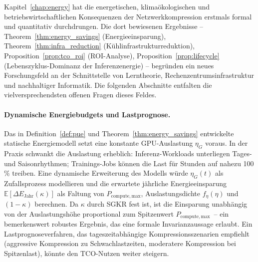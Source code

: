 ﻿\documentclass[12pt, a4paper, openany]{report}
\newcommand{\E}{\mathbb{E}}
\begin{document}
Kapitel~\ref{chap:energy} hat die energetischen, klimaökologischen und
betriebswirtschaftlichen Konsequenzen der Netzwerkkompression erstmals
formal und quantitativ durchdrungen.  Die dort bewiesenen Ergebnisse
-- Theorem~\ref{thm:energy_savings} (Energieeinsparung),
Theorem~\ref{thm:infra_reduction} (Kühlinfrastrukturreduktion),
Proposition~\ref{prop:tco_roi} (ROI-Analyse),
Proposition~\ref{prop:lifecycle} (Lebenszyklus-Dominanz der Inferenzenergie)
-- begründen ein neues Forschungsfeld an der Schnittstelle von
Lerntheorie, Rechenzentrumsinfrastruktur und nachhaltiger Informatik.
Die folgenden Abschnitte entfalten die vielversprechendsten offenen
Fragen dieses Feldes.

\paragraph{Dynamische Energiebudgets und Lastprognose.}
Das in Definition~\ref{def:pue} und Theorem~\ref{thm:energy_savings}
entwickelte statische Energiemodell setzt eine konstante GPU-Auslastung
$\eta_G$ voraus.  In der Praxis schwankt die Auslastung erheblich:
Inferenz-Workloads unterliegen Tages- und Saisonrhythmen; Trainings-Jobs
können die Last für Stunden auf nahezu 100\,\% treiben.  Eine dynamische
Erweiterung des Modells würde $\eta_G(t)$ als Zufallsprozess modellieren
und die erwartete jährliche Energieeinsparung
$\E[\Delta E_{\mathrm{Jahr}}(\kappa)]$ als Faltung von
$P_{\mathrm{compute,max}}$, Auslastungsdichte $f_{\eta}(\eta)$ und $(1-\kappa)$
berechnen.  Da $\kappa$ durch SGKR fest ist, ist die Einsparung
unabhängig von der Auslastungshöhe proportional zum Spitzenwert
$P_{\mathrm{compute,max}}$~-- ein bemerkenswert robustes Ergebnis, das eine
formale Invarianzaussage erlaubt.  Ein Lastprognoseverfahren, das
tageszeit\-abhängige Kompressions\-szenarien empfiehlt
(aggressive Kompression zu Schwachlastzeiten, moderatere Kompression
bei Spitzenlast), könnte den TCO-Nutzen weiter steigern.
\end{document}
